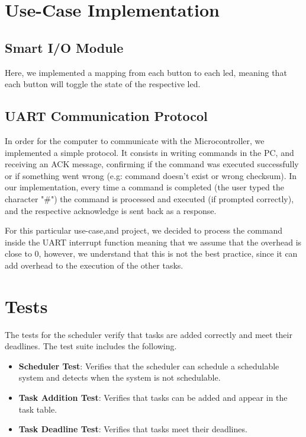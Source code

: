 \documentclass[a4paper,12pt]{article}
\begin{document}
\section{Use-Case Implementation}
\subsection{Smart I/O Module}
Here, we implemented a mapping from each button to each led, meaning that each button will toggle the state of the respective led.

\subsection{UART Communication Protocol}
In order for the computer to communicate with the Microcontroller, we implemented a simple protocol. It consists in writing commands in the PC, and receiving an ACK message, confirming if the command was executed successfully or if something went wrong (e.g: command doesn't exist or wrong checksum).
In our implementation, every time a command is completed (the user typed the character "\#") the command is processed and executed (if prompted correctly), and the respective acknowledge is sent back as a response.

For this particular use-case,and project, we decided to process the command inside the UART interrupt function meaning that we assume that the overhead is close to 0, however, we understand that this is not the best practice, since it can add overhead to the execution of the other tasks.

\section{Tests}
The tests for the scheduler verify that tasks are added correctly and meet their deadlines. The test suite includes the following.
\begin{itemize}
    \item \textbf{Scheduler Test}: Verifies that the scheduler can schedule a schedulable system and detects when the system is not schedulable.
    \item \textbf{Task Addition Test}: Verifies that tasks can be added and appear in the task table.
    \item \textbf{Task Deadline Test}: Verifies that tasks meet their deadlines.
\end{itemize}
\end{document}
